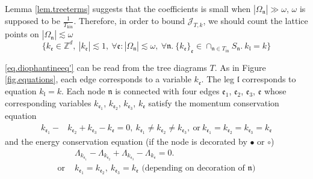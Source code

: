 Lemma \ref{lem.treeterms} suggests that the coefficients is small when $|\Omega_{\mathfrak{n}}|\gg \omega$, $\omega$ is supposed to be $\frac{1}{T_{\text{kin}}}$. Therefore, in order to bound $\mathcal{J}_{T,k}$, we should count the lattice points on $|\Omega_{\mathfrak{n}}|\lesssim \omega$
\begin{equation}\label{eq.diophantineeq'}
 \{k_{\mathfrak{e}}\in \mathbb{Z}^d,\ |k_{\mathfrak{e}}|\lesssim 1,\ \forall \mathfrak{e}: |\Omega_{\mathfrak{n}}|\lesssim \omega,\ \forall \mathfrak{n}. \ \{k_{\mathfrak{e}}\}_{\mathfrak{e}}\in \cap_{\mathfrak{n}\in T_{\text{in}}} S_{\mathfrak{n}}.\ k_{\mathfrak{l}}=k\}
\end{equation}


\eqref{eq.diophantineeq'} can be read from the tree diagrams $T$. As in Figure \ref{fig.equations}, each edge corresponds to a variable $k_{\mathfrak{e}}$. The leg $\mathfrak{l}$ corresponds to equation $k_{\mathfrak{l}}=k$. Each node $\mathfrak{n}$ is connected with four edges $\mathfrak{e}_1$, $\mathfrak{e}_2$, $\mathfrak{e}_3$, $\mathfrak{e}$ whose corresponding variables $k_{\mathfrak{e}_1}$, $k_{\mathfrak{e}_2}$, $k_{\mathfrak{e}_3}$, $k_{\mathfrak{e}}$ satisfy the momentum conservation equation
\begin{equation}
\begin{split}
k_{\mathfrak{e}_1}-&k_{\mathfrak{e}_2}+k_{\mathfrak{e}_3}-k_{\mathfrak{e}}=0,\ k_{\mathfrak{e}_1}\ne k_{\mathfrak{e}_2}\ne k_{\mathfrak{e}_3},\ \text{or}\ k_{\mathfrak{e}_1}= k_{\mathfrak{e}_2}= k_{\mathfrak{e}_3}=k_{\mathfrak{e}}
\end{split}
\end{equation}
and the energy conservation equation (if the node is decorated by $\bullet$ or $\circ$)
\begin{equation}
 \begin{split}
 &\Lambda_{k_{\mathfrak{e}_1}}-\Lambda_{k_{\mathfrak{e}_2}}+\Lambda_{k_{\mathfrak{e}_3}}-\Lambda_{k_{\mathfrak{e}}} =0.
 \\
 \text{or } &\text{$k_{\mathfrak{e}_1}=k_{\mathfrak{e}_2},\ k_{\mathfrak{e}_3}=k_{\mathfrak{e}}$ (depending on decoration of $\mathfrak{n}$)} 
 \end{split}
\end{equation}



